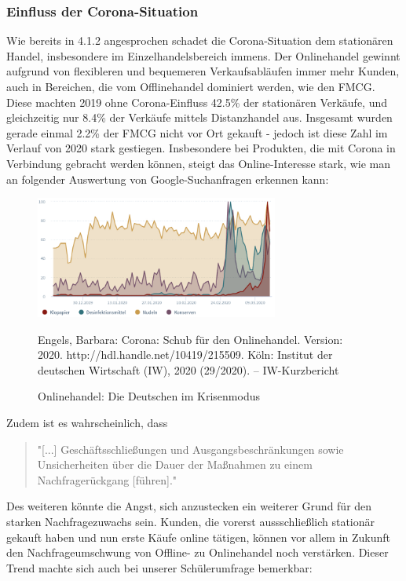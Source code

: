 \begin{folding} \subsubsection{Einfluss der Corona-Situation}
 
 Wie bereits in 4.1.2 angesprochen schadet die Corona-Situation dem stationären Handel, insbesondere im Einzelhandelsbereich immens. Der Onlinehandel gewinnt aufgrund von flexibleren und bequemeren Verkaufsabläufen immer mehr Kunden, auch in Bereichen, die vom Offlinehandel dominiert werden, wie den \ac{FMCG}. 
Diese machten 2019 ohne Corona-Einfluss 42.5\% der stationären Verkäufe, und gleichzeitig nur 8.4\% der Verkäufe mittels Distanzhandel aus. Insgesamt wurden gerade einmal 2.2\% der \ac{FMCG} nicht vor Ort gekauft - jedoch ist diese Zahl im Verlauf von 2020 stark gestiegen\cite{corona-schub}. Insbesondere bei Produkten, die mit Corona in Verbindung gebracht werden können, steigt das Online-Interesse stark, wie man an folgender Auswertung von Google-Suchanfragen erkennen kann: 

 \begin{figure}[h]
    \begin{center}
        \includegraphics[width=8cm]{media/Fabian-Corona-Produkte.png}
        \caption{Onlinehandel: Die Deutschen im Krisenmodus}
        \label{corona-produkte}
        \bildquelle  Engels, Barbara:   Corona: Schub für den Onlinehandel. Version: 2020. http://hdl.handle.net/10419/215509. Köln: Institut der deutschen Wirtschaft (IW), 2020 (29/2020). – IW-Kurzbericht
    \end{center}
\end{figure}
\noindent Zudem ist es wahrscheinlich, dass

\begin{quote}
    "[...] Geschäftsschließungen und Ausgangsbeschränkungen   sowie Unsicherheiten über die Dauer der Maßnahmen zu einem  Nachfragerückgang [führen]."\cite{corona-wettbewerb}
\end{quote}
Des weiteren könnte die Angst, sich anzustecken ein weiterer Grund für den starken Nachfragezuwachs sein. Kunden, die vorerst aussschließlich stationär gekauft haben und nun erste Käufe online tätigen, können vor allem in Zukunft den Nachfrageumschwung von Offline- zu Onlinehandel noch verstärken\cite{corona-schub}. Dieser Trend machte sich auch bei unserer Schülerumfrage bemerkbar: 


\end{folding}
